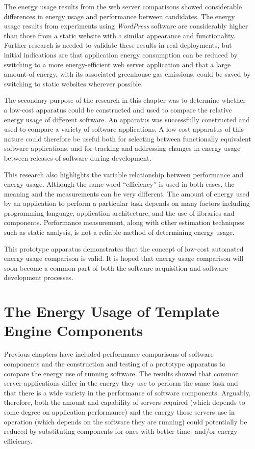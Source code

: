 The energy usage results from the web server comparisons showed considerable differences in energy usage and performance between candidates. The energy usage results from experiments using \emph{WordPress} software are considerably higher than those from a static website with a similar appearance and functionality. Further research is needed to validate these results in real deployments, but initial indications are that application energy consumption can be reduced by switching to a more energy-efficient web server application and that a large amount of energy, with its associated greenhouse gas emissions, could be saved by switching to static websites wherever possible.

The secondary purpose of the research in this chapter was to determine whether a low-cost apparatus could be constructed and used to compare the relative energy usage of different software. An apparatus was successfully constructed and used to compare a variety of software applications. A low-cost apparatus of this nature could therefore be useful both for selecting between functionally equivalent software applications, and for tracking and addressing changes in energy usage between releases of software during development.

This research also highlights the variable relationship between performance and energy usage. Although the same word \enquote{efficiency} is used in both cases, the meaning and the measurements can be very different. The amount of energy used by an application to perform a particular task depends on many factors including \gls{programming language}, application architecture, and the use of libraries and components. Performance measurement, along with other estimation techniques such as static analysis, is not a reliable method of determining energy usage.

This prototype apparatus demonstrates that the concept of low-cost automated energy usage comparison is valid. It is hoped that energy usage comparison will soon become a common part of both the software acquisition and software development processes.

\chapter{The Energy Usage of Template Engine Components}
\label{chapter:comp energy}

Previous chapters have included performance comparisons of software components and the construction and testing of a prototype apparatus to compare the energy use of running software. The results showed that common server applications differ in the energy they use to perform the same task and that there is a wide variety in the performance of software components. Arguably, therefore, both the amount and capability of servers required (which depends to some degree on application performance) and the energy those servers use in operation (which depends on the software they are running) could potentially be reduced by substituting components for ones with better time- and/or energy-efficiency.

